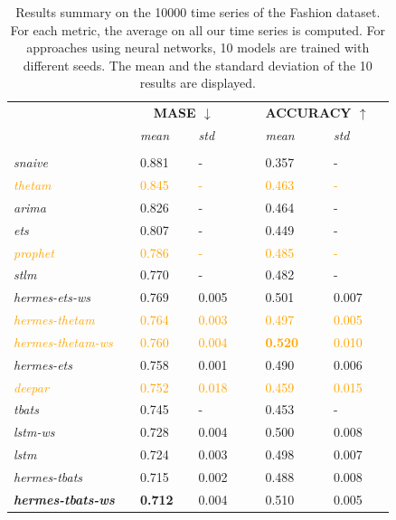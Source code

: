 \documentclass[10pt]{article} %
\begin{document}
\begin{table}
  \caption{Results summary on the 10000 time series of the Fashion dataset. For each metric, the average on all our time series is computed. For approaches using neural networks, 10 models are trained with different seeds. The mean and the standard deviation of the 10 results are displayed.}
  \centering
  \begin{tabular}{l||lllll|lllll}
   &&\multicolumn{3}{c}{\textbf{MASE $\downarrow$}} &&& \multicolumn{3}{c}{\textbf{ACCURACY $\uparrow$}}&\\
    &&  \textit{mean}  && \textit{std} &&&  \textit{mean}  && \textit{std}& \\
	 \hline
	 &&&&&&&&&&\\
     \textit{snaive} && 0.881 && - &&& 0.357 && - &\\
     \textcolor{orange}{\textit{thetam}} && \textcolor{orange}{0.845} && \textcolor{orange}{-} &&& \textcolor{orange}{0.463} && \textcolor{orange}{-}\\
     \textit{arima} && 0.826 && -&&& 0.464 && - & \\
     \textit{ets} && 0.807 && -&&& 0.449 && - & \\
     \textcolor{orange}{\textit{prophet}} && \textcolor{orange}{0.786} && \textcolor{orange}{-} &&& \textcolor{orange}{0.485} && \textcolor{orange}{-}\\
     \textit{stlm} && 0.770 && -&&& 0.482 && - & \\
     \textit{hermes-ets-ws} && 0.769 && 0.005 &&& 0.501 && 0.007 &\\
     \textcolor{orange}{\textit{hermes-thetam}} && \textcolor{orange}{0.764} && \textcolor{orange}{0.003} &&& \textcolor{orange}{0.497} && \textcolor{orange}{0.005}\\
     \textcolor{orange}{\textit{hermes-thetam-ws}} && \textcolor{orange}{0.760} && \textcolor{orange}{0.004} &&& \textcolor{orange}{\textbf{0.520}} && \textcolor{orange}{0.010}\\
     \textit{hermes-ets} && 0.758 && 0.001 &&& 0.490 && 0.006 &\\
     \textcolor{orange}{\textit{deepar}} && \textcolor{orange}{0.752} && \textcolor{orange}{0.018} &&& \textcolor{orange}{0.459} && \textcolor{orange}{0.015}\\
     \textit{tbats} && 0.745 && -&&& 0.453 && - & \\
     \textit{lstm-ws} && 0.728 && 0.004 &&& 0.500 && 0.008 &\\
     \textit{lstm} && 0.724 && 0.003 &&& 0.498 && 0.007 &\\
     \textit{hermes-tbats} && 0.715 && 0.002 &&& 0.488 && 0.008 &\\
     \textbf{\textit{hermes-tbats-ws}} && \textbf{0.712} && 0.004 &&& 0.510 && 0.005 &\\
  \end{tabular}
\label{tab:metricresults}
\end{table}
\end{document}
